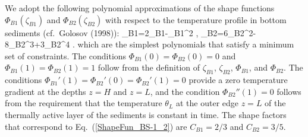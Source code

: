 We adopt the following polynomial approximations of the shape functions
$\Phi_{B1}(\zeta_{B1})$ and $\Phi_{B2}(\zeta_{B2})$ with respect to 
the temperature profile in bottom sediments 
(cf.\ Golosov \etal (1998)):
%
\beq\label{ShapeFun_BS-1_2}
\Phi_{B1}=2\zeta_{B1}-\zeta_{B1}^2 ,
\; \; \; \; \; \;
\Phi_{B2}=6\zeta_{B2}^2-8\zeta_{B2}^3+3\zeta_{B2}^4 .
\eeq
%
which are the simplest polynomials that satisfy a minimum set of constraints.
The conditions 
$\Phi_{B1}(0)=\Phi_{B2}(0)=0$ and $\Phi_{B1}(1)=\Phi_{B2}(1)=1$ 
follow from the definition of $\zeta_{B1}$, $\zeta_{B2}$, $\Phi_{B1}$, and $\Phi_{B2}$. 
The conditions $\Phi_{B1}'(1)=\Phi_{B2}'(0)=\Phi_{B2}'(1)=0$ provide
a zero temperature gradient at the depths $z=H$ and $z=L$,
and the condition $\Phi_{B2}''(1)=0$ follows from the requirement that 
the temperature $\theta_L$ at the outer edge $z=L$ 
of the thermally active layer of the sediments is constant in time.
The shape factors that correspond to Eq.~(\ref{ShapeFun_BS-1_2}) are 
$C_{B1}=2/3$ and $C_{B2}=3/5$.

